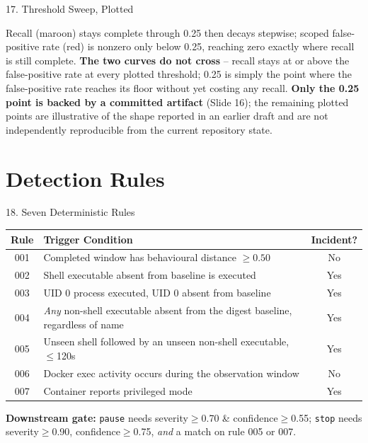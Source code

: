 \documentclass[aspectratio=169, 11pt]{beamer}
\renewcommand{\arraystretch}{1.15}
\newcommand{\hl}[1]{\textcolor{keyRed}{\textbf{#1}}}
\begin{document}
\begin{frame}{17. Threshold Sweep, Plotted}
    \par\vspace{0.1cm}
    \scriptsize Recall (maroon) stays complete through 0.25 then decays stepwise; scoped false-positive rate (red)
    is nonzero only below 0.25, reaching zero exactly where recall is still complete. \hl{The two curves do not
    cross} -- recall stays at or above the false-positive rate at every plotted threshold; 0.25 is simply the
    point where the false-positive rate reaches its floor without yet costing any recall. \textbf{Only the 0.25
    point is backed by a committed artifact} (Slide 16); the remaining plotted points are illustrative of the
    shape reported in an earlier draft and are not independently reproducible from the current repository state.
\end{frame}

\section{Detection Rules}
\begin{frame}{18. Seven Deterministic Rules}
    \scriptsize
    \begin{table}
        \centering
        \renewcommand{\arraystretch}{1.25}
        \begin{tabular}{c p{8.6cm} c}
            \toprule
            \textbf{Rule} & \textbf{Trigger Condition} & \textbf{Incident?} \\
            \midrule
            001 & Completed window has behavioural distance $\geq 0.50$ & No \\
            002 & Shell executable absent from baseline is executed & Yes \\
            003 & UID 0 process executed, UID 0 absent from baseline & Yes \\
            004 & \emph{Any} non-shell executable absent from the digest baseline, regardless of name & Yes \\
            005 & Unseen shell followed by an unseen non-shell executable, $\leq$120s & Yes \\
            006 & Docker exec activity occurs during the observation window & No \\
            007 & Container reports privileged mode & Yes \\
            \bottomrule
        \end{tabular}
    \end{table}
    \footnotesize\textbf{Downstream gate:} \texttt{pause} needs severity$\geq$0.70 \& confidence$\geq$0.55; \texttt{stop} needs severity$\geq$0.90, confidence$\geq$0.75, \emph{and} a match on rule 005 or 007.
\end{frame}
\end{document}
